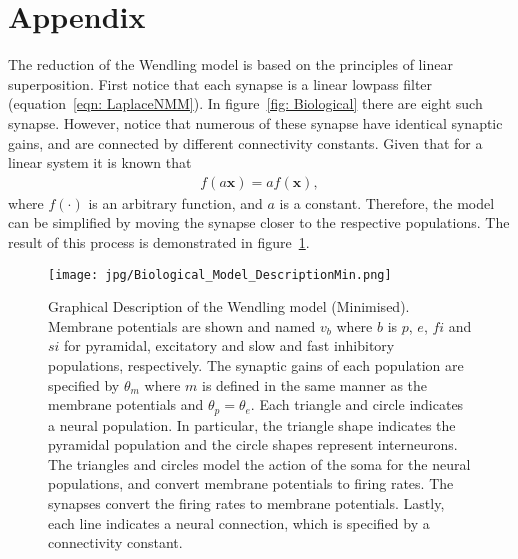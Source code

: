 \section{Appendix}
\label{sec: AppendixA}

The reduction of the Wendling model is based on the principles of linear superposition. First notice that each synapse is a linear lowpass filter (equation~\ref{eqn: LaplaceNMM}). In figure~\ref{fig: Biological} there are eight such synapse. However, notice that numerous of these synapse have identical synaptic gains, and are connected by different connectivity constants. Given that for a linear system it is known that
\begin{align}
f(a\mathbf{x}) = af(\mathbf{x}),
\end{align} where $f(\cdot)$ is an arbitrary function, and $a$ is a constant. Therefore, the model can be simplified by moving the synapse closer to the respective populations. The result of this process is demonstrated in figure~\ref{fig: BiologicalMin}.

\begin{figure}  %
	\centering
		\texttt{[image: jpg/Biological\_Model\_DescriptionMin.png]}
	\caption{Graphical Description of the Wendling model (Minimised). Membrane potentials are shown and named $v_{b}$ where $b$ is $p$, $e$, $fi$ and $si$ for pyramidal, excitatory and slow and fast inhibitory populations, respectively. The synaptic gains of each population are specified by $\theta_{m}$ where $m$ is defined in the same manner as the membrane potentials and $\theta_{p}=\theta_{e}$. Each triangle and circle indicates a neural population. In particular, the triangle shape indicates the pyramidal population and the circle shapes represent interneurons. The triangles and circles model the action of the soma for the neural populations, and convert membrane potentials to firing rates. The synapses convert the firing rates to membrane potentials. Lastly, each line indicates a neural connection, which is specified by a connectivity constant.}
	\label{fig: BiologicalMin}
\end{figure}%

